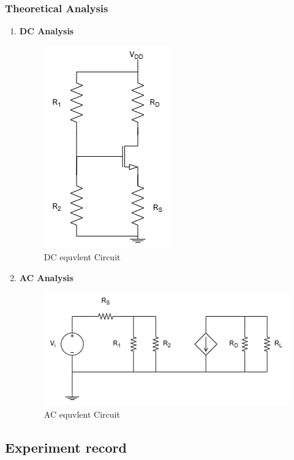     \subsubsection{Theoretical Analysis}
        \begin{enumerate}[a]
            \item \textbf{DC Analysis}\par
                \begin{figure}[H]
                    \centering
                        \includegraphics[width=0.3\linewidth]{Experiment_09/Circuit/L9DC.drawio.png}
                        \caption{DC equvlent Circuit}
                        \label{cir:9DC}
                \end{figure}
            \item \textbf{AC Analysis}\par
                \begin{figure}[H]
                    \centering
                        \includegraphics[width=0.3\linewidth]{Experiment_09/Circuit/L9AC.drawio.png}
                        \caption{AC equvlent Circuit}
                        \label{cir:9AC}
                \end{figure}
        \end{enumerate}

\subsection{Experiment record}
